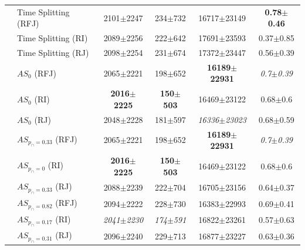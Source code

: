 \begin{table}[t]
\begin{center}
\begin{tabular}{clcccc}
        & Time Splitting (RFJ) & 2101$\pm$2247 & 234$\pm$732 & 16717$\pm$23149 & \textbf{0.78$\pm$0.46} \\
        & Time Splitting (RI) & 2089$\pm$2256 & 222$\pm$642 & 17691$\pm$23593 & 0.37$\pm$0.85\\
        & Time Splitting (RJ) & 2098$\pm$2254 & 231$\pm$674 & 17372$\pm$23447 & 0.56$\pm$0.39\\
        & $AS_0$ (RFJ) & 2065$\pm$2221 & 198$\pm$652 & \textbf{16189$\pm$22931} & \emph{0.7$\pm$0.39}\\
        & $AS_0$ (RI)& \textbf{2016$\pm$2225} & \textbf{150$\pm$503} & 16469$\pm$23122 & 0.68$\pm$0.6\\ 
        & $AS_0$ (RJ)& 2048$\pm$2228 & 181$\pm$597 & \emph{16336$\pm$23023} & 0.68$\pm$0.59\\ 
        & $AS_{p_{\cap} = 0.33}$ (RFJ) & 2065$\pm$2221 & 198$\pm$652 & \textbf{16189$\pm$22931} & \emph{0.7$\pm$0.39}\\
        & $AS_{p_{\cap} = 0}$ (RI) & \textbf{2016$\pm$2225} & \textbf{150$\pm$503} & 16469$\pm$23122 & 0.68$\pm$0.6\\ 
        & $AS_{p_{\cap} = 0.33}$ (RJ) & 2088$\pm$2239 & 222$\pm$704  & 16705$\pm$23156 & 0.64$\pm$0.37\\ 
        & $AS_{p_{\cap} = 0.82}$ (RFJ) & 2094$\pm$2222 & 228$\pm$730 & 16383$\pm$22993 & 0.69$\pm$0.41\\
        & $AS_{p_{\cap} = 0.17}$ (RI) & \emph{2041$\pm$2230} & \emph{174$\pm$591} & 16822$\pm$23261 & 0.57$\pm$0.63\\
        & $AS_{p_{\cap} = 0.31}$ (RJ) & 2096$\pm$2240 & 229$\pm$713 & 16877$\pm$23227 & 0.63$\pm$0.36\\  
        \bottomrule
    \end{tabular}    
\end{center}
\end{table}
